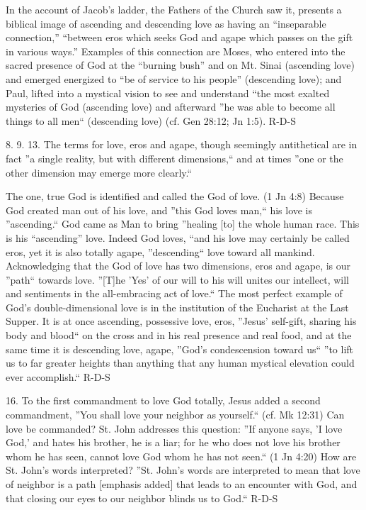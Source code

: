 \documentclass[oneside]{book}
\begin{document}
In the account of Jacob's ladder, the Fathers of the Church saw it,  presents a
biblical image of ascending and descending love as having an ``inseparable
connection,'' ``between eros which seeks God and agape which passes on the gift
in various ways.'' Examples of this connection are Moses, who entered into the
sacred presence of God at the ``burning bush'' and on Mt. Sinai (ascending love)
and emerged energized to ``be of service to his people'' (descending love); and
Paul, lifted into a mystical vision to see and understand ``the most exalted
mysteries of God (ascending love) and afterward ''he was able to become all
things to all men`` (descending love) (cf. Gen 28:12; Jn 1:5).
R-D-S

8. 9. 13. The terms for love, eros and agape, though seemingly antithetical are
in fact ''a single reality, but with different dimensions,`` and at times ''one
or the other dimension may emerge more clearly.``

The one, true God is identified and called the God of love. (1 Jn 4:8) Because
God created man out of his love, and ''this God loves man,`` his love is
''ascending.`` God came as Man to bring ''healing [to] the whole human
race. This is his ``ascending'' love. Indeed God loves, ``and his love may
certainly be called eros, yet it is also totally agape, ''descending`` love
toward all mankind. Acknowledging that the God of love has two dimensions, eros
and agape, is our ''path`` towards love. ''[T]he 'Yes' of our will to his will
unites our intellect, will and sentiments in the all-embracing act of love.``
The most perfect example of God's double-dimensional love is in the institution
of the Eucharist at the Last Supper. It is at once ascending, possessive love,
eros, ''Jesus' self-gift, sharing his body and blood`` on the cross and in his
real presence and real food, and at the same time it is descending love, agape,
''God's condescension toward us`` ''to lift us to far greater heights than
anything that any human mystical elevation could ever accomplish.``
R-D-S

16. To the first commandment to love God totally, Jesus added a second
commandment, ''You shall love your neighbor as yourself.`` (cf. Mk 12:31) Can
love be commanded? St. John addresses this question: ''If anyone says, 'I love
God,' and hates his brother, he is a liar; for he who does not love his brother
whom he has seen, cannot love God whom he has not seen.`` (1 Jn 4:20) How are
St. John's words interpreted? ''St. John's words are interpreted to mean that
love of neighbor is a path [emphasis added] that leads to an encounter with God,
and that closing our eyes to our neighbor blinds us to God.``
R-D-S
\end{document}
